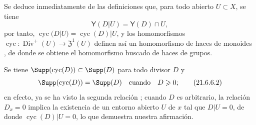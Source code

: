 Se deduce inmediatamente de las definiciones que, para todo abierto $U\subset X$, se tiene
\[
  \boldsymbol{\mathsf Y}(D|U)=\boldsymbol{\mathsf Y}(D)\cap U,
\]
por tanto, $\operatorname{cyc}(D|U)=\operatorname{cyc}(D)|U$, y los homomorfismos $\operatorname{cyc}:\operatorname{Div}^+(U)\to\mathfrak{Z}^1(U)$ definen así un homomorfismo de haces de monoides , de donde se obtiene el homomorfismo buscado  de haces de grupos.

Se tiene $\Supp(\operatorname{cyc}(D))\subset\Supp(D)$ para todo divisor $D$ y
\begin{equation}
\label{IV.21.6.6.2}
  \Supp(\operatorname{cyc}(D))=\Supp(D)\quad\text{cuando}\quad D\geq0;
  \tag{21.6.6.2}
\end{equation}
en efecto, ya se ha visto la segunda relación ;
cuando $D$ es arbitrario, la relación $D_x=0$ implica la existencia de un entorno abierto $U$ de $x$ tal que $D|U=0$, de donde $\operatorname{cyc}(D)|U=0$, lo que demuestra nuestra afirmación.

